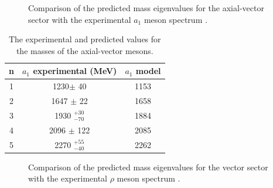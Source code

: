 \documentclass[aps,prd,12pt,nofootinbib]{revtex4}
\begin{document}
\begin{figure}[htb]
\caption{Comparison of the predicted mass eigenvalues for the axial-vector sector with the experimental $a_1$ meson spectrum \cite{PDG}.}
\end{figure}

\begin{table}[htb]
\center
\begin{tabular}{| c || c | c  |}
\hline
n & $a_1$ experimental (MeV) & $a_1$ model \\
\hline
1 & 1230$\pm$ 40 &	    	1153	 \\
2 & 1647 $\pm$ 22 & 	1658	 \\
3 & 1930  $^{+30}_{-70}$ & 1884\\
4 & 2096 $\pm$ 122 &      2085	 \\ 
5 & 2270 $^{+55}_{-40}$  & 2262\\
\hline
\end{tabular}
\caption{The experimental and predicted values for the masses of the axial-vector mesons.}
\label{tabAxial}
\end{table}

\begin{figure}[htb]
\caption{Comparison of the predicted mass eigenvalues for the vector sector with the experimental $\rho$ meson spectrum \cite{PDG}.}
\label{figRho}
\end{figure}
\end{document}
